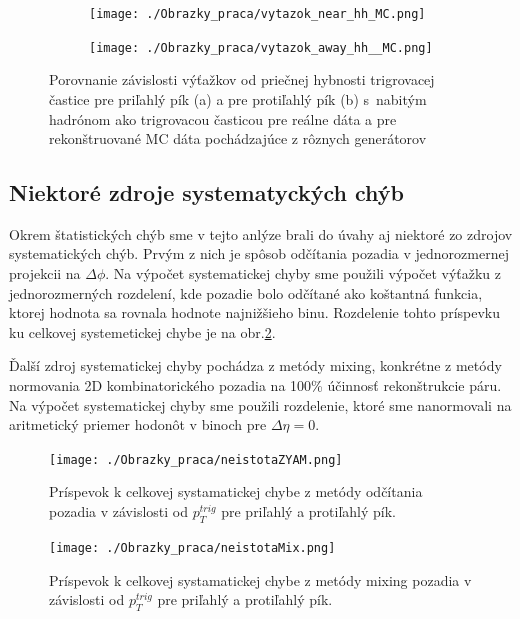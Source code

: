 \documentclass[thesismargins, thesislinespacing]{rnthesis}
\begin{document}
\begin{figure}[hbtp!]
	\centering
	\begin{subfigure}{0.5\textwidth}
		\centering
		\texttt{[image: ./Obrazky\_praca/vytazok\_near\_hh\_MC.png]}
		\caption{}
	\end{subfigure}%
	\begin{subfigure}{0.5\textwidth}
		\centering
		\texttt{[image: ./Obrazky\_praca/vytazok\_away\_hh\_\_MC.png]}
		\caption{}
	\end{subfigure}
	\caption{Porovnanie závislosti výťažkov od priečnej hybnosti trigrovacej častice pre priľahlý pík (a) a pre protiľahlý pík (b) s~nabitým hadrónom ako trigrovacou časticou pre reálne dáta a pre rekonštruované MC dáta pochádzajúce z rôznych generátorov}
	\label{porovnanieh}
\end{figure}

\subsection{Niektoré zdroje systematyckých chýb}

Okrem štatistických chýb sme v tejto anlýze brali do úvahy aj niektoré zo zdrojov systematických chýb. Prvým z nich je spôsob odčítania pozadia v jednorozmernej projekcii na $\Delta\phi$. Na výpočet systematickej chyby sme použili výpočet výťažku z jednorozmerných rozdelení, kde pozadie bolo odčítané ako koštantná funkcia, ktorej hodnota sa rovnala hodnote najnižšieho binu. Rozdelenie tohto príspevku ku celkovej systemetickej chybe je na obr.\ref{systZYAM}.

Ďalší zdroj systematickej chyby pochádza z metódy mixing, konkrétne z metódy normovania 2D kombinatorického pozadia na 100\% účinnosť rekonštrukcie páru. Na výpočet systematickej chyby sme použili rozdelenie, ktoré sme nanormovali na aritmetický priemer hodonôt v binoch pre $\Delta \eta = 0$.  

 \begin{figure}[hbtp!]
	\centering
 	\texttt{[image: ./Obrazky\_praca/neistotaZYAM.png]}
 	\caption{Príspevok k celkovej systamatickej chybe z metódy odčítania pozadia v závislosti od $p_{T}^{trig}$ pre priľahlý a protiľahlý pík.}
 	\label{systZYAM}
 \end{figure}

 \begin{figure}[hbtp!]
	\centering
	\texttt{[image: ./Obrazky\_praca/neistotaMix.png]}
	\caption{Príspevok k celkovej systamatickej chybe z metódy mixing pozadia v závislosti od $p_{T}^{trig}$ pre priľahlý a protiľahlý pík.}
	\label{systMix}
\end{figure}
\end{document}
